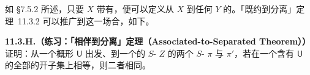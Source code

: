 如 \S7.5.2 所述，只要 $X$ 带有\trAssociatedPoint，便可以定义从 $X$ 到任何 $Y$ 的\trRationalMap{}。「既约到分离」定理~11.3.2 可以推广到这一场合，如下。

\textbf{11.3.H.（练习：「相伴到分离」定理（Associated-to-Separated Theorem））}\quad 证明：从一个\trLocally\trNoetherian{}概形 $\mathsf{U}$ 出发、到一个\trSeparated{}的 $S$-\trScheme{} $Z$ 的两个 $S$-\trMorphism{} $\pi$ 与 $\pi'$，若在一个含有 $\mathsf{U}$ 的全部\trAssociatedPoint{}的开子集上相等，则二者相同。
